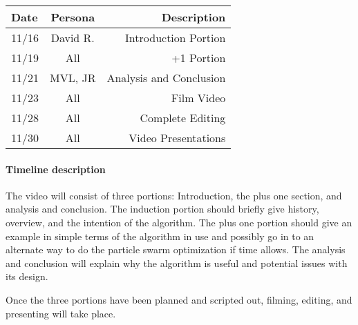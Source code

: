 \documentclass[11pt,twocolumn]{article}
\begin{document}
\begin{table}[h!]
\centering
\begin{tabular}{ |l | c | r|}
  \hline
  Date & Persona & Description \\
  \hline
  \hline
  11/16 & David R. & Introduction Portion \\
  \hline
  11/19 & All & +1 Portion \\
  \hline
  11/21 & MVL, JR & Analysis and Conclusion \\
  \hline
  11/23 & All & Film Video \\
  \hline
  11/28 & All & Complete Editing \\
  \hline
  11/30 & All & Video Presentations \\
  \hline
\end{tabular}
\end{table}

\paragraph{Timeline description}
The video will consist of three portions: Introduction, the plus one section, and analysis and conclusion. The induction portion should briefly give history, overview, and the intention of the algorithm.  The plus one portion should give an example in simple terms of the algorithm in use and possibly go in to an alternate way to do the particle swarm optimization if time allows.  The analysis and conclusion will explain why the algorithm is useful and potential issues with its design.

Once the three portions have been planned and scripted out, filming, editing, and presenting will take place.
\end{document}
